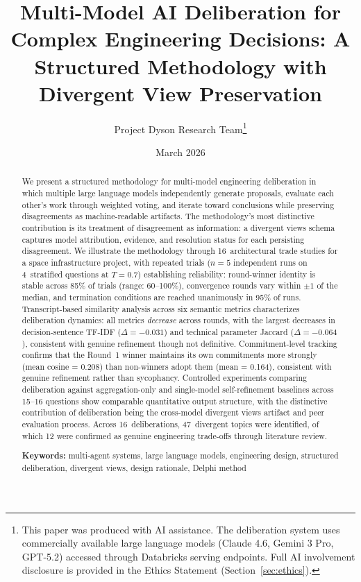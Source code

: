 \documentclass[11pt,a4paper]{article}
\title{\textbf{Multi-Model AI Deliberation for Complex Engineering Decisions: A Structured Methodology with Divergent View Preservation}}
\author{Project Dyson Research Team\thanks{This paper was produced with AI assistance. The deliberation system uses commercially available large language models (Claude 4.6, Gemini 3 Pro, GPT-5.2) accessed through Databricks serving endpoints. Full AI involvement disclosure is provided in the Ethics Statement (Section~\ref{sec:ethics}).}}
\affil{Project Dyson --- Open-Source Space Infrastructure Initiative\\ \texttt{https://projectdyson.org}}
\date{March 2026}
\begin{document}
\maketitle

\begin{abstract}
We present a structured methodology for multi-model engineering deliberation in which multiple large language models independently generate proposals, evaluate each other's work through weighted voting, and iterate toward conclusions while preserving disagreements as machine-readable artifacts. The methodology's most distinctive contribution is its treatment of disagreement as information: a divergent views schema captures model attribution, evidence, and resolution status for each persisting disagreement. We illustrate the methodology through 16~architectural trade studies for a space infrastructure project, with repeated trials ($n = 5$ independent runs on 4~stratified questions at $T = 0.7$) establishing reliability: round-winner identity is stable across 85\% of trials (range: 60--100\%), convergence rounds vary within $\pm 1$ of the median, and termination conditions are reached unanimously in 95\% of runs. Transcript-based similarity analysis across six semantic metrics characterizes deliberation dynamics: all metrics \emph{decrease} across rounds, with the largest decreases in decision-sentence TF-IDF ($\Delta = -0.031$) and technical parameter Jaccard ($\Delta = -0.064$), consistent with genuine refinement though not definitive. Commitment-level tracking confirms that the Round~1 winner maintains its own commitments more strongly (mean cosine = 0.208) than non-winners adopt them (mean = 0.164), consistent with genuine refinement rather than sycophancy. Controlled experiments comparing deliberation against aggregation-only and single-model self-refinement baselines across 15--16 questions show comparable quantitative output structure, with the distinctive contribution of deliberation being the cross-model divergent views artifact and peer evaluation process. Across 16~deliberations, 47~divergent topics were identified, of which 12 were confirmed as genuine engineering trade-offs through literature review.

\medskip
\noindent\textbf{Keywords:} multi-agent systems, large language models, engineering design, structured deliberation, divergent views, design rationale, Delphi method
\end{abstract}
\end{document}
